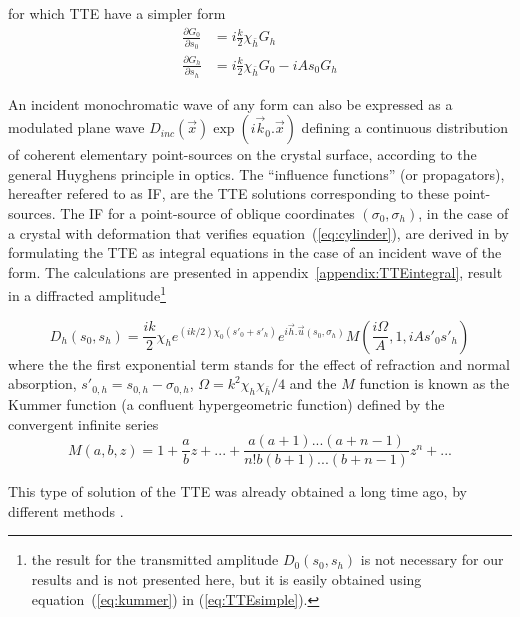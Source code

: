 \documentclass[preprint]{iucr}              %
\begin{document}
for which TTE have a simpler form
  \begin{subequations}
    \label{eq:TTEsimple}
    \begin{align}
      \frac{\partial G_0}{\partial s_0} &= i \frac{k}{2}\chi_{\bar{h}} G_h
      \\
      \frac{\partial G_h}{\partial s_h} &= i \frac{k}{2}\chi_{\bar{h}} G_0 - i A s_0 G_h
    \end{align}
  \end{subequations}

An incident monochromatic wave of any form can also be expressed as a modulated plane wave $D_{inc}(\vec x)\exp(i \vec k_0 . \vec x)$ defining a continuous distribution of coherent elementary point-sources on the crystal surface, according to the general Huyghens principle in optics. The “influence functions” (or propagators), hereafter refered to as IF, are the TTE solutions corresponding to these point-sources. The IF for a point-source of  oblique coordinates $(\sigma_0,\sigma_h)$, in the case of  a crystal with deformation that verifies equation~(\ref{eq:cylinder}), are derived in \cite{GuigayFerrero2016} by formulating the TTE  as integral equations in the case of an incident wave of the form. The calculations are presented in appendix~\ref{appendix:TTEintegral}, result in a diffracted amplitude\footnote{the result for the transmitted amplitude $D_0(s_0,s_h)$ is not necessary for our results and is not presented here, but it is easily obtained using equation~(\ref{eq:kummer}) in (\ref{eq:TTEsimple}).}

  
\begin{equation}
\label{eq:kummer}
    D_h(s_0,s_h) = \frac{i k }{2} \chi_h e^{(ik/2) \chi_0 (s'_0 + s'_h)} e^{i \vec h . \vec u (s_0,\sigma_h)} M(\frac{i\Omega}{A},1,iA s'_0 s'_h)
\end{equation}
where the the first exponential term stands for the effect of refraction and normal absorption, $s'_{0,h}=s_{0,h}-\sigma_{0,h}$, $\Omega=k^2\chi_h\chi_{\bar{h}}/4$ and the $M$ function is known as the Kummer function (a confluent hypergeometric function) defined by the convergent infinite series
\begin{equation}
\label{eq:kummerSeries}
    M(a,b,z) = 1 + \frac{a}{b} z + 
    ... + \frac{a(a+1)...(a+n-1)}{n! b (b+1)...(b+n-1)}z^n+...
\end{equation}

This type of solution of the TTE was already obtained a long time ago, by different methods \cite{Petrashen1974,Katagawa1974,Litzmann1974,Chukhovski1977}.
\end{document}
